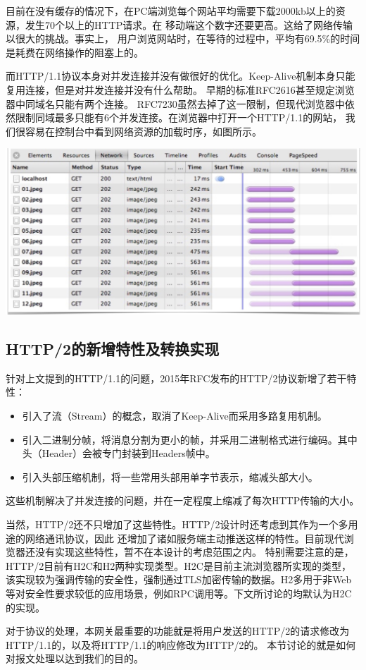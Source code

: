 \documentclass[twoside]{CUGThesis}
\begin{document}
	目前在没有缓存的情况下，在PC端浏览每个网站平均需要下载2000kb以上的资源，发生70个以上的HTTP请求。在
	移动端这个数字还要更高。这给了网络传输以很大的挑战。事实上，
	用户浏览网站时，在等待的过程中，平均有69.5\%的时间是耗费在网络操作的阻塞上的。\par 
	而HTTP/1.1协议本身对并发连接并没有做很好的优化。Keep-Alive机制本身只能复用连接，但是对并发连接并没有什么帮助。
	早期的标准RFC2616甚至规定浏览器中同域名只能有两个连接\cite{fielding2006hypertext}。
	RFC7230虽然去掉了这一限制，但现代浏览器中依然限制同域最多只能有6个并发连接。在浏览器中打开一个HTTP/1.1的网站，
	我们很容易在控制台中看到网络资源的加载时序，如图所示。\\ \par 
	\includegraphics[scale=0.2]{Figures/web_load.jpg}
	\subsection{HTTP/2的新增特性及转换实现}
	针对上文提到的HTTP/1.1的问题，2015年RFC发布的HTTP/2协议新增了若干特性：
	\begin{itemize}
		\item 引入了流（Stream）的概念，取消了Keep-Alive而采用多路复用机制。
		\item 引入二进制分帧，将消息分割为更小的帧，并采用二进制格式进行编码。其中头（Header）会被专门封装到Headers帧中。
		\item 引入头部压缩机制，将一些常用头部用单字节表示，缩减头部大小。
	\end{itemize} \par
	这些机制解决了并发连接的问题，并在一定程度上缩减了每次HTTP传输的大小。\par 
	当然，HTTP/2还不只增加了这些特性。HTTP/2设计时还考虑到其作为一个多用途的网络通讯协议，因此
	还增加了诸如服务端主动推送这样的特性。目前现代浏览器还没有实现这些特性，暂不在本设计的考虑范围之内。
	特别需要注意的是，HTTP/2目前有H2C和H2两种实现类型。H2C是目前主流浏览器所实现的类型，
	该实现较为强调传输的安全性，强制通过TLS加密传输的数据。H2多用于非Web等对安全性要求较低的应用场景，例如RPC调用等。下文所讨论的均默认为H2C的实现。\par
	对于协议的处理，本网关最重要的功能就是将用户发送的HTTP/2的请求修改为HTTP/1.1的，以及将HTTP/1.1的响应修改为HTTP/2的。 
	本节讨论的就是如何对报文处理以达到我们的目的。
\end{document}
